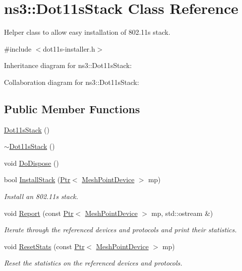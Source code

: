 \hypertarget{classns3_1_1Dot11sStack}{}\section{ns3\+:\+:Dot11s\+Stack Class Reference}
\label{classns3_1_1Dot11sStack}


Helper class to allow easy installation of 802.\+11s stack.  




{\ttfamily \#include $<$dot11s-\/installer.\+h$>$}



Inheritance diagram for ns3\+:\+:Dot11s\+Stack\+:


Collaboration diagram for ns3\+:\+:Dot11s\+Stack\+:
\subsection*{Public Member Functions}
\begin{DoxyCompactItemize}
\item 
\hyperlink{classns3_1_1Dot11sStack_af14ac0a96673ac8497c6736bfba542b8}{Dot11s\+Stack} ()
\item 
\hyperlink{classns3_1_1Dot11sStack_a6847b53b53fe741f396708d44fd3425e}{$\sim$\+Dot11s\+Stack} ()
\item 
void \hyperlink{classns3_1_1Dot11sStack_a5a9897ff296290265be887cceabfad02}{Do\+Dispose} ()
\item 
bool \hyperlink{classns3_1_1Dot11sStack_a2a30483cc69c61c837fbf43f829a2dd3}{Install\+Stack} (\hyperlink{classns3_1_1Ptr}{Ptr}$<$ \hyperlink{classns3_1_1MeshPointDevice}{Mesh\+Point\+Device} $>$ mp)
\begin{DoxyCompactList}\small\item\em Install an 802.\+11s stack. \end{DoxyCompactList}\item 
void \hyperlink{classns3_1_1Dot11sStack_ac45262c3694108f597dc345da40d0bf0}{Report} (const \hyperlink{classns3_1_1Ptr}{Ptr}$<$ \hyperlink{classns3_1_1MeshPointDevice}{Mesh\+Point\+Device} $>$ mp, std\+::ostream \&)
\begin{DoxyCompactList}\small\item\em Iterate through the referenced devices and protocols and print their statistics. \end{DoxyCompactList}\item 
void \hyperlink{classns3_1_1Dot11sStack_a1afb810553aad32e1e23756a972b2a13}{Reset\+Stats} (const \hyperlink{classns3_1_1Ptr}{Ptr}$<$ \hyperlink{classns3_1_1MeshPointDevice}{Mesh\+Point\+Device} $>$ mp)
\begin{DoxyCompactList}\small\item\em Reset the statistics on the referenced devices and protocols. \end{DoxyCompactList}\end{DoxyCompactItemize}
